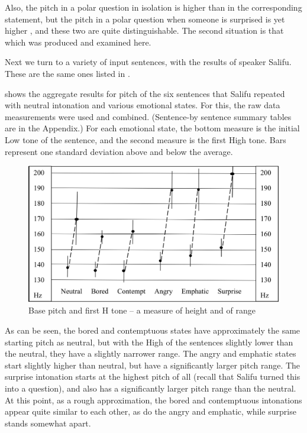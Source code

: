 \documentclass[output=paper]{langsci/langscibook}
\begin{document}
Also, the pitch in a polar question in isolation is higher than in the corresponding statement, but the pitch in a polar question when someone is surprised is yet higher \citep{cahill2012}, and these two are quite distinguishable. The second situation is that which was produced and examined here.


Next we turn to a variety of input sentences, with the results of speaker Salifu. These are the same ones listed in .


 shows the aggregate results for pitch of the six sentences that Salifu repeated with neutral intonation and various emotional states. For this, the raw data measurements were used and combined. (Sentence-by sentence summary tables are in the Appendix.) For each emotional state, the bottom measure is the initial Low tone of the sentence, and the second measure is the first High tone. Bars represent one standard deviation above and below the average.


\begin{figure}[h]
\includegraphics[width=\textwidth]{figures/cahillfig2}
\caption{Base pitch and first H tone -- a measure of height and of range}
\label{fig:2.cahill}
\end{figure}
 
As can be seen, the bored and contemptuous states have approximately the same starting pitch as neutral, but with the High of the sentences slightly lower than the neutral, they have a slightly narrower range.  The angry and emphatic states start slightly higher than neutral, but have a significantly larger pitch range.  The surprise intonation starts at the highest pitch of all (recall that Salifu turned this into a question), and also has a significantly larger pitch range than the neutral. At this point, as a rough approximation, the bored and contemptuous intonations appear quite similar to each other, as do the angry and emphatic, while surprise stands somewhat apart. 
\end{document}
